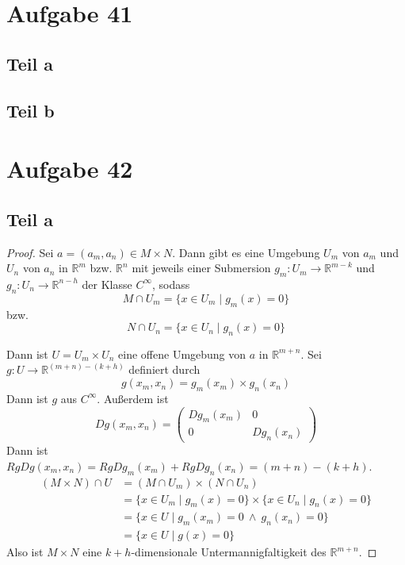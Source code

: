 \documentclass[10pt,a4paper]{article}
\begin{document}
\section{Aufgabe 41}

\subsection{Teil a}

\subsection{Teil b}

\section{Aufgabe 42}

\subsection{Teil a}
\begin{proof}
  Sei $a = (a_{m}, a_{n}) \in M \times N$.
  Dann gibt es eine Umgebung $U_{m}$ von $a_{m}$ und $U_{n}$ von $a_{n}$ in $\mathbb{R}^{m}$ bzw. $\mathbb{R}^{n}$ mit jeweils einer Submersion $g_{m} : U_{m} \rightarrow \mathbb{R}^{m - k}$ und $g_{n} : U_{n} \rightarrow \mathbb{R}^{n - h}$ der Klasse $C^{\infty}$, sodass
  \begin{equation}
    M \cap U_{m} = \{ x \in U_{m} \mid g_{m}(x) = 0 \}
  \end{equation}
  bzw.
  \begin{equation}
    N \cap U_{n} = \{ x \in U_{n} \mid g_{n}(x) = 0 \}
  \end{equation}

  Dann ist $U = U_{m} \times U_{n}$ eine offene Umgebung von $a$ in $\mathbb{R}^{m + n}$.
  Sei $g : U \rightarrow \mathbb{R}^{(m + n) - (k + h)}$ definiert durch
  \begin{equation}
    g(x_{m}, x_{n}) = g_{m}(x_{m}) \times g_{n}(x_{n})
  \end{equation}
  Dann ist $g$ aus $C^{\infty}$.
  Außerdem ist
  \begin{equation}
    Dg(x_{m}, x_{n}) = \begin{pmatrix}
      Dg_{m}(x_{m}) & 0\\
      0 & Dg_{n}(x_{n})
    \end{pmatrix}
  \end{equation}
  Dann ist $Rg Dg(x_{m}, x_{n}) = Rg Dg_{m}(x_{m}) + Rg Dg_{n}(x_{n}) = (m + n) - (k + h)$.
  \begin{align*}
    (M \times N) \cap U & = (M \cap U_{m}) \times (N \cap U_{n})\\
    & = \{ x \in U_{m} \mid g_{m}(x) = 0 \} \times \{ x \in U_{n} \mid g_{n}(x) = 0 \}\\
    & = \{ x \in U \mid g_{m}(x_{m}) = 0\ \land\ g_{n}(x_{n}) = 0 \}\\
    & = \{ x \in U \mid g(x) = 0 \}
  \end{align*}
  Also ist $M \times N$ eine $k + h$-dimensionale Untermannigfaltigkeit des $\mathbb{R}^{m + n}$.
\end{proof}
\end{document}
